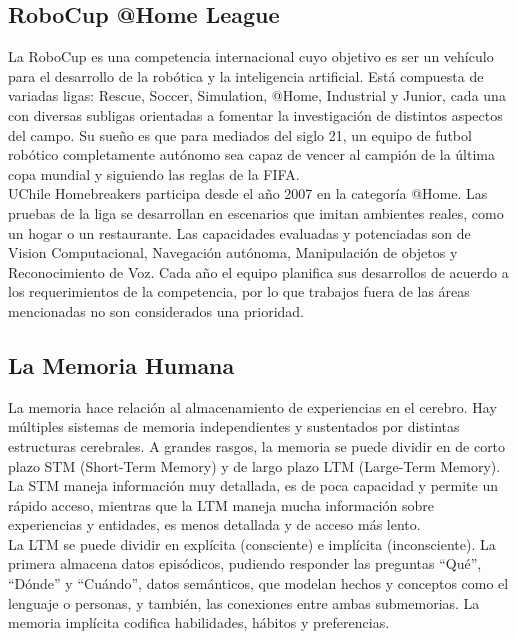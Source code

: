 \documentclass[12pt,letterpaper,spanish]{article}
\begin{document}
\subsection{RoboCup @Home League}

La RoboCup es una competencia internacional cuyo objetivo es ser un veh\'iculo para el desarrollo de la rob\'otica y la inteligencia artificial. Est\'a compuesta de variadas ligas: Rescue, Soccer, Simulation, @Home, Industrial y Junior, cada una con diversas subligas orientadas a fomentar la investigaci\'on de distintos aspectos del campo. Su sue\~no es que para mediados del siglo 21, un equipo de futbol rob\'otico completamente aut\'onomo sea capaz de vencer al campi\'on de la última copa mundial y siguiendo las reglas de la FIFA\cite{robocup:rulebook_2017}.\\ 

UChile Homebreakers participa desde el a\~no 2007 en la categor\'ia @Home. Las pruebas de la liga se desarrollan en escenarios que imitan ambientes reales, como un hogar o un restaurante. Las capacidades evaluadas y potenciadas son de Vision Computacional, Navegaci\'on aut\'onoma, Manipulaci\'on de objetos y Reconocimiento de Voz. Cada a\~no el equipo planifica sus desarrollos de acuerdo a los requerimientos de la competencia, por lo que trabajos fuera de las \'areas mencionadas no son considerados una prioridad.\\


\subsection{La Memoria Humana}

La memoria hace relaci\'on al almacenamiento de experiencias en el cerebro. Hay m\'ultiples sistemas de memoria independientes y sustentados por distintas estructuras cerebrales. A grandes rasgos, la memoria se puede dividir en de corto plazo STM (Short-Term Memory) y de largo plazo LTM (Large-Term Memory). La STM maneja informaci\'on muy detallada, es de poca capacidad y permite un r\'apido acceso, mientras que la LTM maneja mucha informaci\'on sobre experiencias y entidades, es menos detallada y de acceso m\'as lento.\\

La LTM se puede dividir en expl\'icita (consciente) e impl\'icita (inconsciente). La primera almacena datos epis\'odicos, pudiendo responder las preguntas ``Qu\'e'', ``D\'onde'' y ``Cu\'ando'', datos sem\'anticos, que modelan hechos y conceptos como el lenguaje o personas, y tambi\'en, las conexiones entre ambas submemorias. La memoria impl\'icita codifica habilidades, h\'abitos y preferencias.\\
\end{document}
